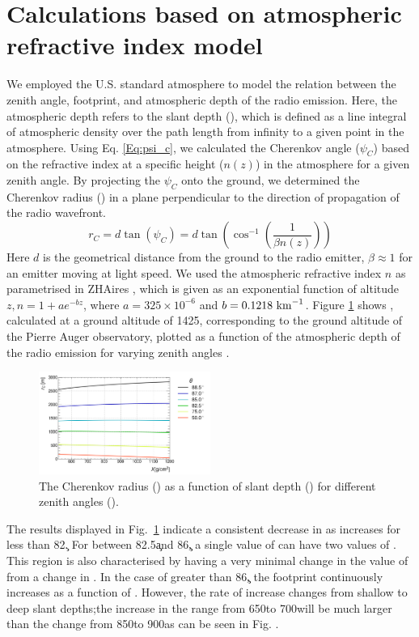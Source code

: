\section{Calculations based on atmospheric refractive index model}\label{sec:1}
We employed the U.S. standard atmosphere \cite{united1976u} to model the relation between the zenith angle, footprint, and atmospheric depth of the radio emission. Here, the atmospheric depth refers to the slant depth (\x), which is defined as a line integral of atmospheric density over the path length from infinity to a given point in the atmosphere. Using Eq. \ref{Eq:psi_c}, we calculated the Cherenkov angle ($\psi_C$) based on the refractive index at a specific height ($n(z)$) in the atmosphere for a given zenith angle. By projecting the $\psi_C$ onto the ground, we determined the Cherenkov radius (\rc) in a plane perpendicular to the direction of propagation of the radio wavefront.
\begin{equation}\label{Eq:psi_c}
r_C = d \tan(\psi_C)  =  d \tan\left( \cos^{-1} \left( \frac{1}{\beta n(z)} \right)\right)
 \end{equation} 
Here $d$ is the geometrical distance from the ground to the radio emitter, $\beta \approx 1$ for an emitter moving at light speed. We used the atmospheric refractive index $n$ as parametrised in ZHAires \cite{ZHAireS}, which is given as an exponential function of altitude $z,n = 1+ae^{-bz}$, where $a=325  \times 10^{-6} $ and  $b=0.1218 ~\rm{km}^{-1}$. Figure \ref{fig:gramm3} shows \rc, calculated at a ground altitude of 1425\m, corresponding to the ground altitude of the Pierre Auger observatory, plotted as a function of the atmospheric depth of the radio emission for varying zenith angles \thet.

\begin{figure}[ht!]
    \includegraphics[width=0.5\textwidth]{gramm3}
    \caption{ The Cherenkov radius (\rc) as a function of slant depth (\x) for different zenith angles (\thet).}
    \label{fig:gramm3}
\end{figure}

The results displayed in Fig.~\ref{fig:gramm3} indicate a consistent decrease in \rc as \x increases for \thet less than 82\c. For \thet between 82.5\c and 86\c,  a single value of \rc can have two values of \x. This \thet region is also characterised by having a very minimal change in the value of \rc from a change in \x. In the case of \thet greater than 86\c, the footprint continuously increases as a function of \x. However, the rate of increase changes from shallow to deep slant depths;\ie the increase in the \rc range from 650\gr to 700\gr will be much larger than the change from 850\gr to 900\gr as can be seen in Fig. \label{fig:gramm3}.

